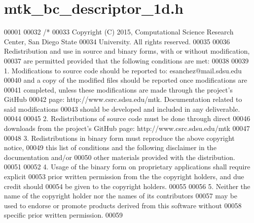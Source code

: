 \hypertarget{mtk__bc__descriptor__1d_8h_source}{\section{mtk\+\_\+bc\+\_\+descriptor\+\_\+1d.\+h}
\label{mtk__bc__descriptor__1d_8h_source}
}

\begin{DoxyCode}
00001 
00032 \textcolor{comment}{/*}
00033 \textcolor{comment}{Copyright (C) 2015, Computational Science Research Center, San Diego State}
00034 \textcolor{comment}{University. All rights reserved.}
00035 \textcolor{comment}{}
00036 \textcolor{comment}{Redistribution and use in source and binary forms, with or without modification,}
00037 \textcolor{comment}{are permitted provided that the following conditions are met:}
00038 \textcolor{comment}{}
00039 \textcolor{comment}{1. Modifications to source code should be reported to: esanchez@mail.sdsu.edu}
00040 \textcolor{comment}{and a copy of the modified files should be reported once modifications are}
00041 \textcolor{comment}{completed, unless these modifications are made through the project's GitHub}
00042 \textcolor{comment}{page: http://www.csrc.sdsu.edu/mtk. Documentation related to said modifications}
00043 \textcolor{comment}{should be developed and included in any deliverable.}
00044 \textcolor{comment}{}
00045 \textcolor{comment}{2. Redistributions of source code must be done through direct}
00046 \textcolor{comment}{downloads from the project's GitHub page: http://www.csrc.sdsu.edu/mtk}
00047 \textcolor{comment}{}
00048 \textcolor{comment}{3. Redistributions in binary form must reproduce the above copyright notice,}
00049 \textcolor{comment}{this list of conditions and the following disclaimer in the documentation and/or}
00050 \textcolor{comment}{other materials provided with the distribution.}
00051 \textcolor{comment}{}
00052 \textcolor{comment}{4. Usage of the binary form on proprietary applications shall require explicit}
00053 \textcolor{comment}{prior written permission from the the copyright holders, and due credit should}
00054 \textcolor{comment}{be given to the copyright holders.}
00055 \textcolor{comment}{}
00056 \textcolor{comment}{5. Neither the name of the copyright holder nor the names of its contributors}
00057 \textcolor{comment}{may be used to endorse or promote products derived from this software without}
00058 \textcolor{comment}{specific prior written permission.}
00059 \textcolor{comment}{}

\end{DoxyCode}
